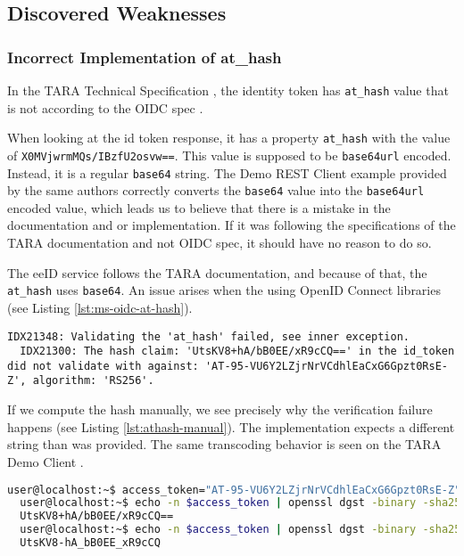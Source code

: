 \subsection{Discovered Weaknesses}

\subsubsection{Incorrect Implementation of at\_hash}

In the TARA Technical Specification \cite{tara-technical}, the identity token has \texttt{at\_hash} value that is not according to the OIDC spec \cite{oidc}.

When looking at the id token response, it has a property \texttt{at\_hash} with the value of \texttt{X0MVjwrmMQs/IBzfU2osvw==}. This value is supposed to be \texttt{base64url} encoded. Instead, it is a regular \texttt{base64} string. The Demo REST Client example provided by the same authors \cite{tara-demorest} correctly converts the \texttt{base64} value into the \texttt{base64url} encoded value, which leads us to believe that there is a mistake in the documentation and or implementation. If it was following the specifications of the TARA documentation and not OIDC spec, it should have no reason to do so.

The eeID service follows the TARA documentation, and because of that, the \texttt{at\_hash} uses \texttt{base64}. An issue arises when the using OpenID Connect libraries (see Listing \ref{lst:ms-oidc-at-hash}).

\begin{lstlisting}[caption={Microsoft.IdentityModel.Protocols.OpenIdConnect fails to validate at\_hash}, label={lst:ms-oidc-at-hash}]
  IDX21348: Validating the 'at_hash' failed, see inner exception.
  IDX21300: The hash claim: 'UtsKV8+hA/bB0EE/xR9cCQ==' in the id_token did not validate with against: 'AT-95-VU6Y2LZjrNrVCdhlEaCxG6Gpzt0RsE-Z', algorithm: 'RS256'.
\end{lstlisting}

If we compute the hash manually, we see precisely why the verification failure happens (see Listing \ref{lst:athash-manual}). The implementation expects a different string than was provided. The same transcoding behavior is seen on the TARA Demo Client \cite{tara-demorest}.

\begin{lstlisting}[caption={Verifying at\_hash manually}, label={lst:athash-manual}, language={bash}]
  user@localhost:~$ access_token="AT-95-VU6Y2LZjrNrVCdhlEaCxG6Gpzt0RsE-Z"
  user@localhost:~$ echo -n $access_token | openssl dgst -binary -sha256 | head -c 16 | base64
  UtsKV8+hA/bB0EE/xR9cCQ==
  user@localhost:~$ echo -n $access_token | openssl dgst -binary -sha256 | head -c 16 | base64 | tr '/+' '_-' | tr -d '='
  UtsKV8-hA_bB0EE_xR9cCQ
\end{lstlisting}


